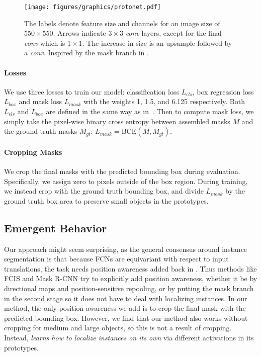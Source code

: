 \documentclass[10pt,journal,compsoc]{IEEEtran}
\begin{document}
    \begin{figure}
    \centering
    
\texttt{[image: figures/graphics/protonet.pdf]}


    \caption{ The labels denote feature size and channels for an image size of $550 \times 550$. Arrows indicate $3\times 3$ \textit{conv} layers, except for the final \textit{conv} which is $1 \times 1$. The increase in size is an upsample followed by a \textit{conv}. Inspired by the mask branch in \cite{maskrcnn}. }
\label{fig:protonet}
\end{figure} 

\paragraph{Losses} We use three losses to train our model: classification loss $L_{cls}$, box regression loss $L_{box}$ and mask loss $L_{mask}$ with the weights 1, 1.5, and 6.125 respectively. Both $L_{cls}$ and $L_{box}$ are defined in the same way as in~\cite{ssd}. Then to compute mask loss, we simply take the pixel-wise binary cross entropy between assembled masks $M$ and the ground truth masks $M_{gt}$: $L_{mask} = \text{BCE}(M, M_{gt})$.

\paragraph{Cropping Masks}
\label{sec:crop_mask}
We crop the final masks with the predicted bounding box during evaluation.  Specifically, we assign zero to pixels outside of the box region.  During training, we instead crop with the ground truth bounding box, and divide $L_{mask}$ by the ground truth box area to preserve small objects in the prototypes.

    
\subsection{Emergent Behavior}
Our approach might seem surprising, as the general consensus around instance segmentation is that because FCNs are equivariant with respect to input translations, the task needs position awareness added back in \cite{fcis}. Thus methods like FCIS \cite{fcis} and Mask R-CNN \cite{maskrcnn} try to explicitly add position awareness, whether it be by directional maps and position-sensitive repooling, or by putting the mask branch in the second stage so it does not have to deal with localizing instances. In our method, the only position awareness we add is to crop the final mask with the predicted bounding box. However, we find that our method also works without cropping for medium and large objects, so this is not a result of cropping. Instead, \methodname{} \textit{learns how to localize instances on its own} via different activations in its prototypes.
\end{document}
